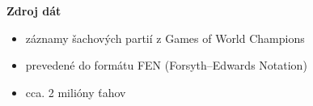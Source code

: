 \documentclass[red]{beamer}
\begin{document}
\begin{frame}
\begin{center}
\begin{minipage}{0.4\textwidth}
\begin{center}
\end{center}
\end{minipage}
\end{center} 
\textbf{Zdroj dát}
\begin{center}
\begin{itemize}
\item záznamy šachových partií z Games of World Champions
\item prevedené do formátu FEN (Forsyth–Edwards Notation)


\item cca. 2 milióny ťahov 
\end{itemize}
\end{center}
\end{frame}
\end{document}
